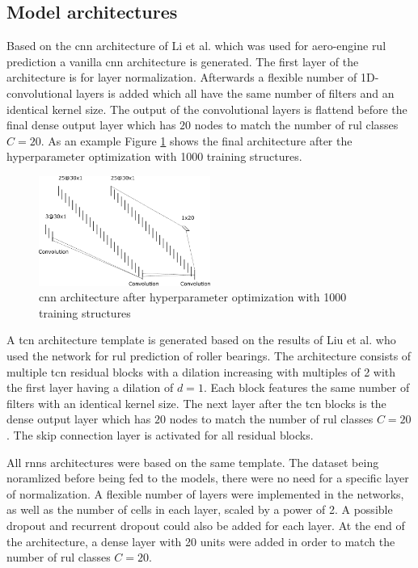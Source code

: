 \documentclass[conference]{IEEEtran}
\begin{document}

\noindent
\subsection{Model architectures}

Based on the \gls{cnn} architecture of Li et al. \cite{Li2018} which was used for aero-engine \gls{rul} prediction a vanilla \gls{cnn} architecture is generated. The first layer of the architecture is for layer normalization. Afterwards a flexible number of 1D-convolutional layers is added which all have the same number of filters and an identical kernel size. The output of the convolutional layers is flattend before the final dense output layer which has $ 20 $ nodes to match the number of \gls{rul} classes $ C = 20 $. As an example Figure \ref{fig:cnn_architecture_1000_structures} shows the final architecture after the hyperparameter optimization with 1000 training structures.

\begin{figure}[htp]
	\centering
	\includegraphics[width=0.5\textwidth]{cnn_architecture_1000_structures.pdf}
	\caption{\gls{cnn} architecture after hyperparameter optimization with 1000 training structures}
	\label{fig:cnn_architecture_1000_structures}
\end{figure}

A \gls{tcn} architecture template is generated based on the results of Liu et al. \cite{Liu2019} who used the network for \gls{rul} prediction of roller bearings. The architecture consists of multiple \gls{tcn} residual blocks with a dilation increasing with multiples of 2 with the first layer having a dilation of $ d = 1 $. Each block features the same number of filters with an identical kernel size. The next layer after the \gls{tcn} blocks is the dense output layer which has $ 20 $ nodes to match the number of \gls{rul} classes $ C = 20 $. The skip connection layer is activated for all residual blocks.

All \glspl{rnn} architectures were based on the same template. The dataset being noramlized before being fed to the models, there were no need for a specific layer of normalization. A flexible number of layers were implemented in the networks, as well as the number of cells in each layer, scaled by a power of 2. A possible dropout and recurrent dropout could also be added for each layer. At the end of the architecture, a dense layer with 20 units were added in order to match the number of \gls{rul} classes $ C = 20 $.  
\end{document}

